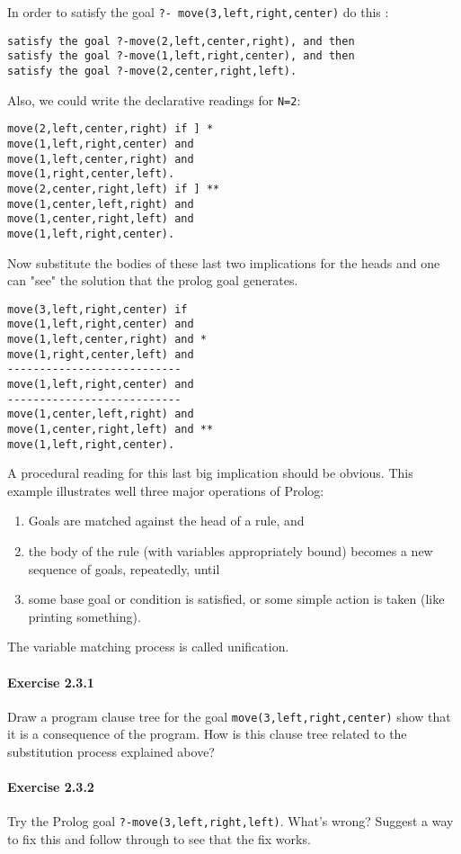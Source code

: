 In order to satisfy the goal \verb|?- move(3,left,right,center)| do this : 

\begin{verbatim}
satisfy the goal ?-move(2,left,center,right), and then 
satisfy the goal ?-move(1,left,right,center), and then 
satisfy the goal ?-move(2,center,right,left). 
\end{verbatim}

Also, we could write the declarative readings for \verb|N=2|:

\begin{verbatim}
move(2,left,center,right) if ] * 
move(1,left,right,center) and 
move(1,left,center,right) and 
move(1,right,center,left). 
move(2,center,right,left) if ] ** 
move(1,center,left,right) and 
move(1,center,right,left) and 
move(1,left,right,center). 
\end{verbatim}

Now substitute the bodies of these last two implications for the heads and one
can "see" the solution that the prolog goal generates.

\begin{verbatim}
move(3,left,right,center) if 
move(1,left,right,center) and 
move(1,left,center,right) and * 
move(1,right,center,left) and 
--------------------------- 
move(1,left,right,center) and 
--------------------------- 
move(1,center,left,right) and 
move(1,center,right,left) and ** 
move(1,left,right,center). 
\end{verbatim}

A procedural reading for this last big implication should be obvious. This
example illustrates well three major operations of Prolog:
\begin{enumerate}[nosep]
  \item 
Goals are matched against the head of a rule, and
  \item 
the body of the rule (with variables appropriately bound) becomes a new sequence
of goals, repeatedly, until
  \item 
some base goal or condition is satisfied, or some simple action is taken (like
printing something).
\end{enumerate}
 
The variable matching process is called unification.

\paragraph{Exercise 2.3.1} Draw a program clause tree for the goal
\verb'move(3,left,right,center)' show that it is a consequence of the program.
How is this clause tree related to the substitution process explained above?

\paragraph{Exercise 2.3.2} Try the Prolog goal \verb|?-move(3,left,right,left)|.
What's wrong? Suggest a way to fix this and follow through to see that the fix
works.
